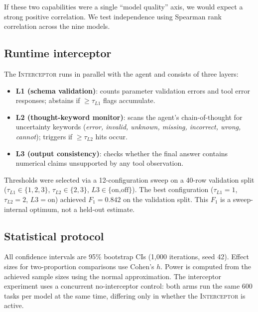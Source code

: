 \documentclass[preprint,review,12pt,3p]{elsarticle}
\newcommand{\interceptor}{\textsc{Interceptor}\xspace}
\begin{document}
If these two capabilities were a single ``model quality'' axis, we would
expect a strong positive correlation.
We test independence using Spearman rank correlation across the nine
models.

\subsection{Runtime interceptor}

The \interceptor{} runs in parallel with the agent and consists of three
layers:
\begin{itemize}
  \item \textbf{L1 (schema validation)}: counts parameter validation
    errors and tool error responses; abstains if $\geq \tau_{L1}$
    flags accumulate.
  \item \textbf{L2 (thought-keyword monitor)}: scans the agent's
    chain-of-thought for uncertainty keywords (\emph{error, invalid,
    unknown, missing, incorrect, wrong, cannot}); triggers if
    $\geq \tau_{L2}$ hits occur.
  \item \textbf{L3 (output consistency)}: checks whether the final
    answer contains numerical claims unsupported by any tool
    observation.
\end{itemize}

Thresholds were selected via a 12-configuration sweep on a 40-row
validation split ($\tau_{L1}{\in}\{1,2,3\}$, $\tau_{L2}{\in}\{2,3\}$,
$L3{\in}\{\text{on,off}\}$).
The best configuration ($\tau_{L1}{=}1$, $\tau_{L2}{=}2$,
$L3{=}\text{on}$) achieved $F_1{=}0.842$ on the validation split.
This $F_1$ is a sweep-internal optimum, not a held-out estimate.

\subsection{Statistical protocol}

All confidence intervals are 95\% bootstrap CIs (1{,}000 iterations,
seed 42).
Effect sizes for two-proportion comparisons use Cohen's $h$.
Power is computed from the achieved sample sizes using the normal
approximation.
The interceptor experiment uses a concurrent no-interceptor control:
both arms run the same 600 tasks per model at the same time, differing
only in whether the \interceptor{} is active.


\end{document}
